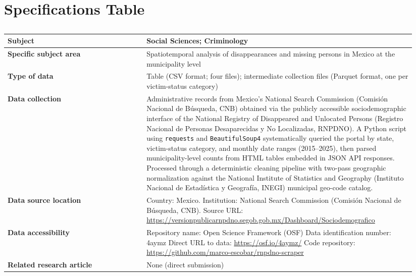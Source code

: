 \documentclass[3p]{elsarticle}
\begin{document}
\section*{Specifications Table}

\begin{table}[h!]
\centering
\caption*{}
\renewcommand{\arraystretch}{1.4}
\begin{tabular}{>{\bfseries}p{0.32\linewidth} p{0.62\linewidth}}
\toprule
Subject & Social Sciences; Criminology \\
\midrule
Specific subject area &
  Spatiotemporal analysis of disappearances and missing
  persons in Mexico at the municipality level \\
\midrule
Type of data &
  Table (CSV format; four files); intermediate collection files
  (Parquet format, one per victim-status category) \\
\midrule
Data collection &
  Administrative records from Mexico's National Search Commission
  (Comisi\'{o}n Nacional de B\'{u}squeda, CNB) obtained via the publicly
  accessible sociodemographic interface of the National Registry
  of Disappeared and Unlocated Persons (Registro Nacional de
  Personas Desaparecidas y No Localizadas, RNPDNO).
  A Python script using \texttt{requests} and \texttt{BeautifulSoup4}
  systematically queried the portal by state, victim-status
  category, and monthly date ranges (2015--2025), then parsed
  municipality-level counts from HTML tables embedded in JSON
  API responses.
  Processed through a deterministic cleaning pipeline
  with two-pass geographic normalization against the
  National Institute of Statistics and Geography (Instituto
  Nacional de Estad\'{i}stica y Geograf\'{i}a, INEGI) municipal
  geo-code catalog. \\
\midrule
Data source location &
  Country: Mexico.
  Institution: National Search Commission (Comisi\'{o}n Nacional de B\'{u}squeda, CNB).
  Source URL:
  \url{https://versionpublicarnpdno.segob.gob.mx/Dashboard/Sociodemografico} \\
\midrule
Data accessibility &
  Repository name: Open Science Framework (OSF) \newline
  Data identification number: 4aymz \newline
  Direct URL to data: \url{https://osf.io/4aymz/} \newline
  Code repository: \url{https://github.com/marco-escobar/rnpdno-scraper} \\
\midrule
Related research article &
  None (direct submission) \\
\bottomrule
\end{tabular}
\end{table}
\clearpage
\end{document}
